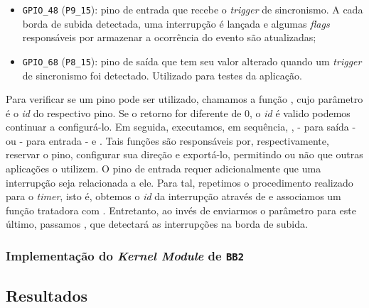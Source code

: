 \begin{itemize} \renewcommand\labelitemi{--}
  \item \texttt{GPIO\_48} (\texttt{P9\_15}): pino de entrada que recebe o
  \textit{trigger} de sincronismo. A cada borda de subida detectada, uma
  interrupção é lançada e algumas \textit{flags} responsáveis por armazenar a
  ocorrência do evento são atualizadas;

  \item \texttt{GPIO\_68} (\texttt{P8\_15}): pino de saída que tem seu valor
  alterado quando um \textit{trigger} de sincronismo foi detectado. Utilizado
  para testes da aplicação.
\end{itemize}

Para verificar se um pino pode ser utilizado, chamamos a função
, cujo parâmetro é o \textit{id} do respectivo pino. Se o
retorno for diferente de 0, o \textit{id} é valido podemos continuar a
configurá-lo. Em seguida, executamos, em sequência,
,  - para saída - ou
 - para entrada - e . Tais
funções são responsáveis por, respectivamente, reservar o pino, configurar sua
direção e exportá-lo, permitindo ou não que outras aplicações o utilizem. O pino
de entrada requer adicionalmente que uma interrupção seja relacionada a ele.
Para tal, repetimos o procedimento realizado para o \textit{timer}, isto é,
obtemos o \textit{id} da interrupção através de  e associamos
um função tratadora com . Entretanto, ao invés de enviarmos o
parâmetro  para este último, passamos
, que detectará as interrupções na borda de subida.

\subsubsection{Implementação do \textit{Kernel Module} de \texttt{BB2}}

\subsection {Resultados}





